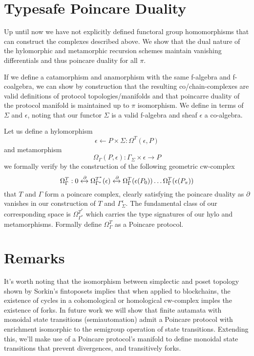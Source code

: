 \documentclass{article}
\begin{document}
\section{Typesafe Poincare Duality}
Up until now we have not explicitly defined functoral group homomorphisms that can construct the complexes described above. We show that the dual nature of the hylomorphic and metamorphic recursion schemes maintain vanishing differentials and thus poincare duality for all $\pi$.

If we define a catamorphism and anamorphism with the same f-algebra and f-coalgebra, we can show by construction that the resulting co/chain-complexes are valid definitions of protocol topologies/manifolds and that poincarre duality of the protocol manifold is maintained up to $\pi$ isomorphism. We define in terms of $\Sigma$ and $\epsilon$, noting that our functor $\Sigma$ is a valid f-algebra and sheaf $\epsilon$ a co-algebra.

Let us define a hylomorphism
\begin{equation} \label{eq1}
\epsilon \leftarrow P \times \Sigma  : \Omega^T(\epsilon, P)
\end{equation} \label{eq1}
and metamorphism
\begin{equation} \label{eq1}
\Omega_\Gamma(P, \epsilon):\Gamma_\Sigma \times \epsilon \rightarrow P  
\end{equation} \label{eq1}
we formally verify by the construction of the following geometric cw-complex
\begin{equation} \label{eq1}
\Omega^T_\Gamma: 0 \xleftrightarrow{\partial} \Omega^{T^*}_{\Gamma^*}(\epsilon) \xleftrightarrow{\partial}  \Omega^T_\Gamma (\epsilon(P_0)) \dots \Omega^T_\Gamma (\epsilon(P_\pi))
\end{equation} \label{eq1}
that $T$ and $\Gamma$ form a poincare complex, clearly satisfying the poincare duality as $\partial$ vanishes in our construction of $T$ and $\Gamma^\epsilon_\Sigma$. The fundamental class of our corresponding space is $\Omega^{T^*}_{\Gamma^*}$ which carries the type signatures of our hylo and metamorphisms. Formally define $\Omega^{T}_{\Gamma}$  as a Poincare protocol.

\section{Remarks} 
It's worth noting that the isomorphism between simplectic and poset topology shown by Sorkin's fintoposets implies that when applied to blockchains, the existence of cycles in a cohomological or homological cw-complex imples the existence of forks. In future work we will show that finite autamata with monoidal state transitions (semiautomation) admit a Poincare protocol with enrichment isomorphic to the semigroup operation of state transitions. Extending this, we'll make use of a Poincare protocol's manifold to define monoidal state transitions that prevent divergences, and transitively forks.


\end{document}
